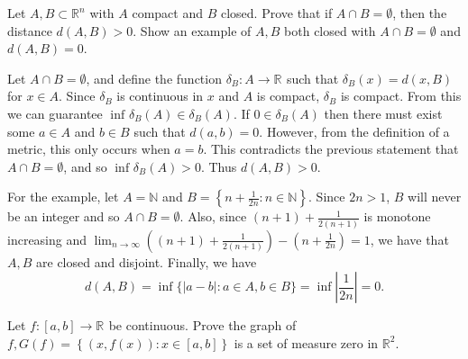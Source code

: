 
\begin{problem}{1}
  Let $A,B \subset \mathbb{R}^{n}$ with $A$ compact and $B$ closed. Prove that if $A \cap B = \emptyset$, then the distance $d(A,B) > 0$.
  Show an example of $A,B$ both closed with $A \cap B = \emptyset$ and $d(A,B) = 0$.
\end{problem} 

\begin{solution}

  Let $A \cap B = \emptyset$, and define the function $ \delta_{B} : A \to \mathbb{R}^{} $ such that $\delta_{B}(x) = d(x,B)$ for $x \in A$.
  Since $\delta_{B}$ is continuous in $x$ and $A$ is compact, $\delta_{B}$ is compact.
  From this we can guarantee $\inf_{}\delta_{B}(A) \in \delta_{B}(A)$.
  If $0 \in \delta_{B}(A)$ then there must exist some $a \in A$ and $b \in B$ such that $d(a,b) = 0$.
  However, from the definition of a metric, this only occurs when $a = b$.
  This contradicts the previous statement that $A \cap B = \emptyset$, and so $ \inf_{}\delta_{B}(A) > 0$.
  Thus $d(A,B) > 0$.

  For the example, let $A = \mathbb{N}$ and $B = \left\{ n + \frac{1}{2n} : n \in \mathbb{N} \right\}$.
  Since $2n > 1$, $B$ will never be an integer and so $A \cap B = \emptyset$.
  Also, since $(n+1) + \frac{1}{2(n+1)}$ is monotone increasing and $\lim_{n\to \infty} ((n+1) + \frac{1}{2(n+1)}) - (n + \frac{1}{2n}) = 1$, we have that $A,B$ are closed and disjoint.
  Finally, we have
  \[
  d(A,B) = \inf\{\left| a - b \right| : a \in A, b \in B\} = \inf\left| \frac{1}{2n} \right| = 0
  .\] 

\end{solution}

\pagebreak

\begin{problem}{2}
  Let $ f : [a,b] \to \mathbb{R}^{} $ be continuous. Prove the graph of $f, G(f) = \left\{ (x,f(x)) : x \in [a,b] \right\}$ is a set of measure zero in $\mathbb{R}^{2}$.
\end{problem}
    

